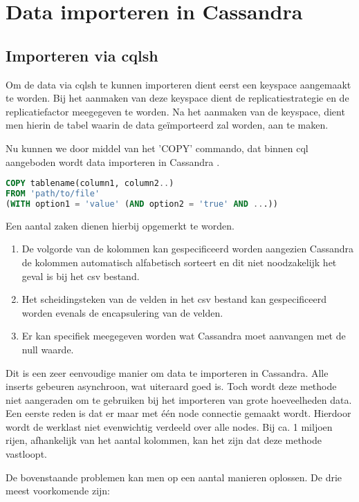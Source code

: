 \chapter{Data importeren in Cassandra}
\label{ch:cassandra_import}

\section{Importeren via cqlsh}
Om de data via cqlsh te kunnen importeren dient eerst een keyspace aangemaakt te worden.
Bij het aanmaken van deze keyspace dient de replicatiestrategie en de replicatiefactor meegegeven te worden.
Na het aanmaken van de keyspace, dient men hierin de tabel waarin de data geïmporteerd zal worden, aan te maken.

Nu kunnen we door middel van het 'COPY' commando, dat binnen cql aangeboden wordt data importeren in Cassandra \citep{Cannon2012Import}.

\begin{lstlisting}[language=SQL, breaklines=true]
COPY tablename(column1, column2..)
FROM 'path/to/file'
(WITH option1 = 'value' (AND option2 = 'true' AND ...))
\end{lstlisting}

Een aantal zaken dienen hierbij opgemerkt te worden.

\begin{enumerate}
	\item De volgorde van de kolommen kan gespecificeerd worden aangezien Cassandra de kolommen automatisch alfabetisch sorteert en dit niet noodzakelijk het geval is bij het csv bestand.
	\item Het scheidingsteken van de velden in het csv bestand kan gespecificeerd worden evenals de encapsulering van de velden.
	\item Er kan specifiek meegegeven worden wat Cassandra moet aanvangen met de null waarde.
\end{enumerate}

Dit is een zeer eenvoudige manier om data te importeren in Cassandra.
Alle inserts gebeuren asynchroon, wat uiteraard goed is.
Toch wordt deze methode niet aangeraden om te gebruiken bij het importeren van grote hoeveelheden data.
Een eerste reden is dat er maar met één node connectie gemaakt wordt.
Hierdoor wordt de werklast niet evenwichtig verdeeld over alle nodes.
Bij ca. 1 miljoen rijen, afhankelijk van het aantal kolommen, kan het zijn dat deze methode vastloopt.

De bovenstaande problemen kan men op een aantal manieren oplossen.
De drie meest voorkomende zijn:

